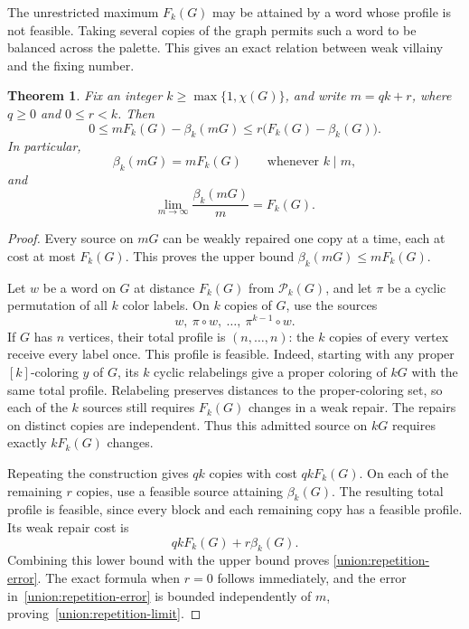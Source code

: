 \documentclass[11pt,reqno]{amsart}
\numberwithin{equation}{section}
\newtheorem{theorem}{Theorem}[section]
\theoremstyle{definition}
\theoremstyle{remark}
\begin{document}
The unrestricted maximum $F_k(G)$ may be attained by a word whose
profile is not feasible.  Taking several copies of the graph permits
such a word to be balanced across the palette.  This gives an exact
relation between weak villainy and the fixing number.

\begin{theorem}\label{union:repetition-theorem}
Fix an integer $k\ge\max\{1,\chi(G)\}$, and write $m=qk+r$, where
$q\ge0$ and $0\le r<k$.  Then
\begin{equation}\label{union:repetition-error}
 0\le mF_k(G)-\beta_k(mG)
 \le r\bigl(F_k(G)-\beta_k(G)\bigr).
\end{equation}
In particular,
\begin{equation}\label{union:repetition-exact}
 \beta_k(mG)=mF_k(G)\qquad\text{whenever }k\mid m,
\end{equation}
and
\begin{equation}\label{union:repetition-limit}
 \lim_{m\to\infty}\frac{\beta_k(mG)}m=F_k(G).
\end{equation}
\end{theorem}

\begin{proof}
Every source on $mG$ can be weakly repaired one copy at a time, each
at cost at most $F_k(G)$.  This proves the upper bound
$\beta_k(mG)\le mF_k(G)$.

Let $w$ be a word on $G$ at distance $F_k(G)$ from
$\mathcal P_k(G)$, and let $\pi$ be a cyclic permutation of all $k$
color labels.  On $k$ copies of $G$, use the sources
\[
 w,\ \pi\circ w,\ \ldots,\ \pi^{k-1}\circ w.
\]
If $G$ has $n$ vertices, their total profile is
$(n,\ldots,n)$: the $k$ copies of every vertex receive every label
once.  This profile is feasible.  Indeed, starting with any proper
$[k]$-coloring $y$ of $G$, its $k$ cyclic relabelings give a proper coloring
of $kG$ with the same total profile.
Relabeling preserves distances to the proper-coloring set, so each
of the $k$ sources still requires $F_k(G)$ changes in a weak repair.
The repairs on distinct copies are independent.  Thus this admitted
source on $kG$ requires exactly $kF_k(G)$ changes.

Repeating the construction gives $qk$ copies with cost $qkF_k(G)$.
On each of the remaining $r$ copies, use a feasible source attaining
$\beta_k(G)$.  The resulting total profile is feasible, since
every block and each remaining copy has a feasible profile.
Its weak repair cost is
\[
 qkF_k(G)+r\beta_k(G).
\]
Combining this lower bound with the upper bound proves
\eqref{union:repetition-error}.  The exact formula when $r=0$ follows
immediately, and the error in~\eqref{union:repetition-error} is bounded
independently of $m$, proving~\eqref{union:repetition-limit}.
\end{proof}
\end{document}
